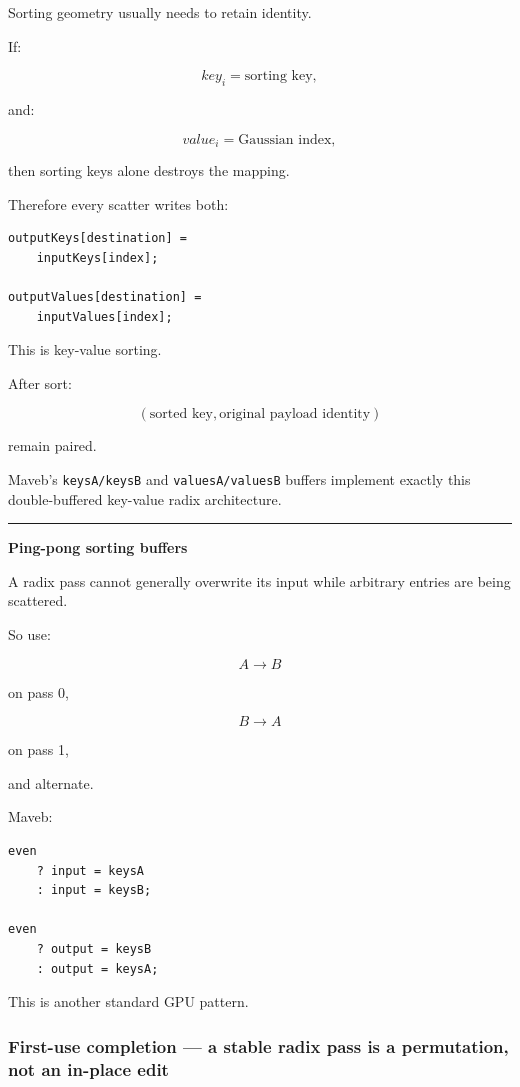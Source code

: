 Sorting geometry usually needs to retain identity.

If:

\[
key_i=\text{sorting key},
\]

and:

\[
value_i=\text{Gaussian index},
\]

then sorting keys alone destroys the mapping.

Therefore every scatter writes both:

\protect{}\label{oxmxax}%
\begin{verbatim}
outputKeys[destination] =
    inputKeys[index];

outputValues[destination] =
    inputValues[index];
\end{verbatim}

This is key-value sorting.

After sort:

\[
\boxed{
(\text{sorted key},\text{original payload identity})
}
\]

remain paired.

Maveb's \texttt{keysA/keysB} and \texttt{valuesA/valuesB} buffers implement exactly this double-buffered key-value radix architecture.

\begin{center}\rule{0.5\linewidth}{0.5pt}\end{center}

\textbf{Ping-pong sorting buffers}

A radix pass cannot generally overwrite its input while arbitrary entries are being scattered.

So use:

\[
A\rightarrow B
\]

on pass 0,

\[
B\rightarrow A
\]

on pass 1,

and alternate.

Maveb:

\protect{}\label{w6g26n}%
\begin{verbatim}
even
    ? input = keysA
    : input = keysB;

even
    ? output = keysB
    : output = keysA;
\end{verbatim}

This is another standard GPU pattern.

\subsubsection{First-use completion --- a stable radix pass is a permutation, not an in-place edit}\label{03-visual-computing-i-ch016-first-use-completion-a-stable-radix-pass-is-a-permutation-not-an-in-place-edit}

